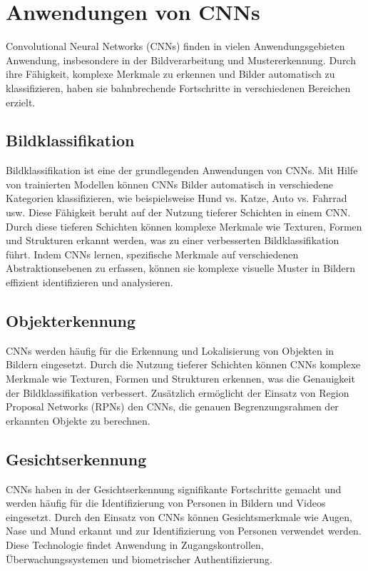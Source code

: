 \section{Anwendungen von CNNs}

	Convolutional Neural Networks (CNNs) finden in vielen Anwendungsgebieten Anwendung, insbesondere in der Bildverarbeitung und Mustererkennung.
	Durch ihre Fähigkeit, komplexe Merkmale zu erkennen und Bilder automatisch zu klassifizieren, haben sie bahnbrechende Fortschritte in verschiedenen Bereichen erzielt.

\subsection{Bildklassifikation}

    Bildklassifikation ist eine der grundlegenden Anwendungen von CNNs. 
    Mit Hilfe von trainierten Modellen können CNNs Bilder automatisch in verschiedene Kategorien klassifizieren, wie beispielsweise Hund vs. Katze, Auto vs. Fahrrad usw. Diese Fähigkeit beruht auf der Nutzung tieferer Schichten in einem CNN. 
    Durch diese tieferen Schichten können komplexe Merkmale wie Texturen, Formen und Strukturen erkannt werden, was zu einer verbesserten Bildklassifikation führt. 
    Indem CNNs lernen, spezifische Merkmale auf verschiedenen Abstraktionsebenen zu erfassen, können sie komplexe visuelle Muster in Bildern effizient identifizieren und analysieren.

\subsection{Objekterkennung}

	CNNs werden häufig für die Erkennung und Lokalisierung von Objekten in Bildern eingesetzt.
	Durch die Nutzung tieferer Schichten können CNNs komplexe Merkmale wie Texturen, Formen und Strukturen erkennen, was die Genauigkeit der Bildklassifikation verbessert.
	Zusätzlich ermöglicht der Einsatz von Region Proposal Networks (RPNs) den CNNs, die genauen Begrenzungsrahmen der erkannten Objekte zu berechnen.

\subsection{Gesichtserkennung}

	CNNs haben in der Gesichtserkennung signifikante Fortschritte gemacht und werden häufig für die Identifizierung von Personen in Bildern und Videos eingesetzt.
	Durch den Einsatz von CNNs können Gesichtsmerkmale wie Augen, Nase und Mund erkannt und zur Identifizierung von Personen verwendet werden.
	Diese Technologie findet Anwendung in Zugangskontrollen, Überwachungssystemen und biometrischer Authentifizierung.

